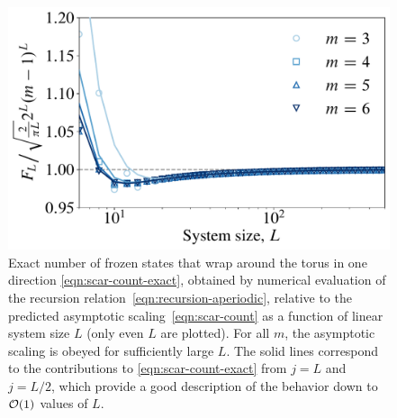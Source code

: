 \begin{figure}[ht!]
    \centering
    \includegraphics[width=0.55\linewidth]{img/exact_scar_count.pdf}
    \caption[Exact counting of frozen states]{Exact number of frozen states that wrap around the torus in one direction \eqref{eqn:scar-count-exact}, obtained by numerical evaluation of the recursion relation~\eqref{eqn:recursion-aperiodic}, relative to the predicted asymptotic scaling~\eqref{eqn:scar-count} as a function of linear system size $L$ (only even $L$ are plotted). For all $m$, the asymptotic scaling is obeyed for sufficiently large $L$. The solid lines correspond to the contributions to \eqref{eqn:scar-count-exact} from $j = L$ and $j = L/2$, which provide a good description of the behavior down to $\cal{O}(1)$ values of $L$.}
    \label{fig:scar-count}
\end{figure}


